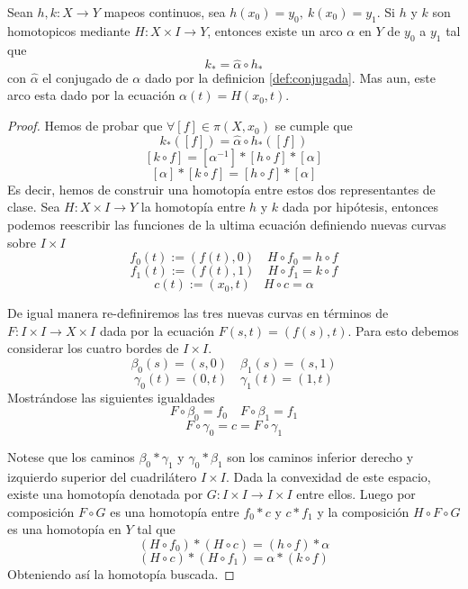 \begin{lema} \label{lem:equiv-hom-lift}
  Sean \(h,k : X \to Y\) mapeos continuos, sea \(h (x_0) = y_0,\ k(x_0)
  = y_1\). Si \(h\) y \(k\) son homotopicos mediante \(H : X \times I
  \to Y\), entonces existe un arco \(\alpha\) en \(Y\) de \(y_0\) a
  \(y_1\) tal que
  \[k_* = \hat \alpha \circ h_* \]
  con \(\hat \alpha\) el conjugado de \(\alpha\) dado por la definicion
  \ref{def:conjugada}. Mas aun, este arco esta dado por la ecuación
  \(\alpha (t) = H (x_0, t)\).
\end{lema}
\begin{proof}
  Hemos de probar que \(\forall [f] \in \pi (X, x_0)\) se cumple que
  \[ k_* ([f]) = \hat \alpha \circ h_* ([f]) \]
  \[ [k \circ f] = [ \alpha^{-1} ] *  [h \circ f] * [\alpha] \]
  \[ [ \alpha ] * [k \circ f] =  [h \circ f] * [\alpha] \]
  Es decir, hemos de construir una homotopía entre estos dos
  representantes de clase. Sea \(H : X \times I \to Y\) la homotopía
  entre \(h\) y \(k\) dada por hipótesis, entonces podemos reescribir
  las funciones de la ultima ecuación definiendo nuevas curvas sobre \(I
  \times I\)
  \[ f_0(t) := (f(t), 0) \quad H \circ f_0 = h \circ f \]
  \[ f_1(t) := (f(t), 1) \quad H \circ f_1 = k \circ f \]
  \[ c(t) := (x_0, t) \quad H \circ c = \alpha \]

  De igual manera re-definiremos las tres nuevas curvas en términos de
  \(F : I \times I \to X \times I\) dada por la ecuación \(F(s,t) =
  (f(s),t)\). Para esto debemos considerar los cuatro bordes de
  \(I \times I\).
  \[ \beta_0(s) = (s, 0) \quad \beta_1(s) = (s, 1)\]
  \[ \gamma_0(t) = (0, t) \quad \gamma_1(t) = (1, t)\]
  Mostrándose las siguientes igualdades
  \[ F \circ \beta_0 = f_0 \quad F \circ \beta_1 = f_1\]
  \[ F \circ \gamma_0 = c = F \circ \gamma_1 \]

  Notese que los caminos \(\beta_0 * \gamma_1\) y \(\gamma_0 * \beta_1\)
  son los caminos inferior derecho y izquierdo superior del cuadrilátero
  \(I \times I\). Dada la convexidad de este espacio, existe una
  homotopía denotada por \(G : I \times I \to I \times I \) entre ellos.
  Luego por composición \(F \circ G\) es una homotopía entre \(f_0 * c\) y
  \(c * f_1\) y la composición \(H \circ F \circ G\) es una homotopía en
  \(Y\) tal que
  \[ (H \circ f_0) * (H \circ c) = (h \circ f) * \alpha \]
  \[ (H \circ c) * (H \circ f_1) = \alpha * (k \circ f) \]
  Obteniendo así la homotopía buscada.
\end{proof}


